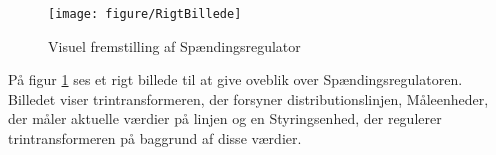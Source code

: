 \begin{figure}[H]
	\centering
	\texttt{[image: figure/RigtBillede]}
	\caption{Visuel fremstilling af Spændingsregulator}
	\label{fig:Rigtbillede}
\end{figure}

På figur \ref{fig:Rigtbillede} ses et rigt billede til at give oveblik over Spændingsregulatoren. Billedet viser trintransformeren, der forsyner distributionslinjen, Måleenheder, der måler aktuelle værdier på linjen og en Styringsenhed, der regulerer trintransformeren på baggrund af disse værdier. 